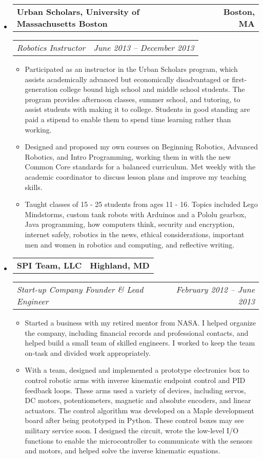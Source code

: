 \documentclass[10pt,letterpaper]{article}
\makeatletter
\newcommand{\headerrow}[2]
{\begin{tabular*}{\linewidth}{l@{\extracolsep{\fill}}r}
	#1 &
	#2 \\
\end{tabular*}}
\makeatother
\begin{document}
\begin{itemize}
    \item
    \headerrow
		{\textbf{Urban Scholars, University of Massachusetts Boston}}
		{\textbf{Boston, MA}}
	\headerrow
		{\emph{Robotics Instructor}}
		{\emph{June 2013 -- December 2013}}
	\begin{itemize}
        \item Participated as an instructor in the Urban Scholars program, which assists academically advanced but economically disadvantaged or first-generation college bound high school and middle school students.  The program provides afternoon classes, summer school, and tutoring, to assist students with making it to college.  Students in good standing are paid a stipend to enable them to spend time learning rather than working.
        \item Designed and proposed my own courses on Beginning Robotics, Advanced Robotics, and Intro Programming, working them in with the new Common Core standards for a balanced curriculum.  Met weekly with the academic coordinator to discuss lesson plans and improve my teaching skills.
        \item Taught classes of 15 - 25 students from ages 11 - 16.  Topics included Lego Mindstorms, custom tank robots with Arduinos and a Pololu gearbox, Java programming, how computers think, security and encryption, internet safely, robotics in the news, ethical considerations, important men and women in robotics and computing, and reflective writing.
	\end{itemize}
	\item
	\headerrow
		{\textbf{SPI Team, LLC}}
		{\textbf{Highland, MD}}
	\headerrow
		{\emph{Start-up Company Founder \& Lead Engineer}}
		{\emph{February 2012 -- June 2013}}
	\begin{itemize}
		\item Started a business with my retired mentor from NASA\@.  I helped organize the company, including financial records and professional contacts, and helped build a small team of skilled engineers.  I worked to keep the team on-task and divided work appropriately.
		\item With a team, designed and implemented a prototype electronics box to control robotic arms with inverse kinematic endpoint control and PID feedback loops.  These arms used a variety of devices, including servos, DC motors, potentiometers, magnetic and absolute encoders, and linear actuators.  The control algorithm was developed on a Maple development board after being prototyped in Python.  These control boxes may see military service soon.  I designed the circuit, wrote the low-level I/O functions to enable the microcontroller to communicate with the sensors and motors, and helped solve the inverse kinematic equations.

\end{itemize}
\end{itemize}
\end{document}
